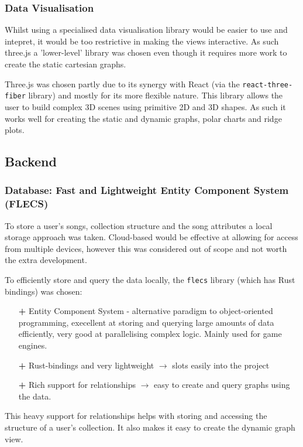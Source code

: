 \subsubsection{Data Visualisation}
Whilst using a specialised data visualisation library would be easier to use and intepret, it would be too restrictive in making the views interactive. As such three.js a 'lower-level' library was chosen even though it requires more work to create the static cartesian graphs.

Three.js was chosen partly due to its synergy with React (via the \lstinline|react-three-fiber| library) and mostly for its more flexible nature. This library allows the user to build complex 3D scenes using primitive 2D and 3D shapes. As such it works well for creating the static and dynamic graphs, polar charts and ridge plots.

\subsection{Backend}
\subsubsection{Database: Fast and Lightweight Entity Component System (FLECS)}
To store a user's songs, collection structure and the song attributes a local storage approach was taken. Cloud-based would be effective at allowing for access from multiple devices, however this was considered out of scope and not worth the extra development.

To efficiently store and query the data locally, the \lstinline|flecs| library (which has Rust bindings) was chosen:\begin{itemize}
    \item[\textbf{+}] Entity Component System - alternative paradigm to object-oriented programming, execellent at storing and querying large amounts of data efficiently, very good at parallelising complex logic. Mainly used for game engines.
    \item[\textbf{+}] Rust-bindings and very lightweight \(\to\) slots easily into the project %
    \item[\textbf{+}] Rich support for relationships \(\to\) easy to create and query graphs using the data.
\end{itemize}

This heavy support for relationships helps with storing and accessing the structure of a user's collection. It also makes it easy to create the dynamic graph view.

